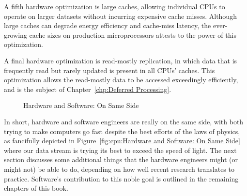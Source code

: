 A fifth hardware optimization is large caches, allowing individual
CPUs to operate on larger datasets without incurring expensive cache
misses.
Although large caches can degrade energy efficiency and cache-miss
latency, the ever-growing cache sizes on production microprocessors
attests to the power of this optimization.

A final hardware optimization is read-mostly replication, in which
data that is frequently read but rarely updated is present in all
CPUs' caches.
This optimization allows the read-mostly data to be accessed
exceedingly efficiently, and is the subject of
Chapter~\ref{chp:Deferred Processing}.

\begin{figure}[tb]
\centering
{}
\caption{Hardware and Software: On Same Side}
\end{figure}

In short, hardware and software engineers are really on the same side,
with both trying to make computers go fast despite the best efforts of
the laws of physics, as fancifully depicted in
Figure~\ref{fig:cpu:Hardware and Software: On Same Side}
where our data stream is trying its best to exceed the speed of light.
The next section discusses some additional things that the hardware engineers
might (or might not) be able to do, depending on how well recent
research translates to practice.
Software's contribution to this noble goal is outlined in the remaining
chapters of this book.
